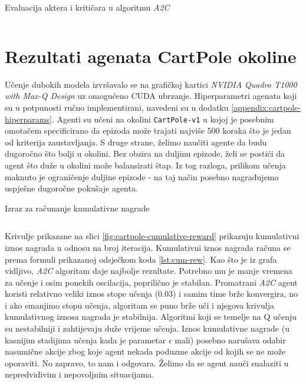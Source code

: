 \begin{listing}[H]
    \caption{Evaluacija aktera i kritičara u algoritmu \textit{A2C}}
    \inputminted{python}{snippets/a2c-eval.py}
    \label{lst:a2c-eval}
\end{listing}

\section{Rezultati agenata CartPole okoline}

Učenje dubokih modela izvršavalo se na grafičkoj kartici \textit{NVIDIA Quadro T1000 with Max-Q Design} uz omogućeno CUDA ubrzanje. Hiperparametri agenata koji su u potpunosti ručno implementirani, navedeni su u dodatku \ref{appendix:cartpole-hiperparams}. Agenti su učeni na okolini \texttt{CartPole-v1} u kojoj je posebnim omotačem specificirano da epizoda može trajati najviše $500$ koraka što je jedan od kriterija zaustavljanja. S druge strane, želimo naučiti agente da budu dugoročno što bolji u okolini. Bez obzira na duljinu epizode, želi se postići da agent što duže u okolini može balansirati štap. Iz tog razloga, prilikom učenja maknuto je ograničenje duljine epizode - na taj način posebno nagrađujemo uspješne dugoročne pokušaje agenta.

\begin{listing}[H]
    \caption{Izraz za računanje kumulativne nagrade}
    \inputminted{python}{snippets/cumulative_reward.py}
    \label{lst:cum-rew}
\end{listing}

Krivulje prikazane na slici \ref{fig:cartpole-cumulative-reward} prikazuju kumulativni iznos nagrada u odnosu na broj iteracija. Kumulativni iznos nagrada računa se prema formuli prikazanoj odsječkom koda \ref{lst:cum-rew}. Kao što je iz grafa vidljivo, \textit{A2C} algoritam daje najbolje rezultate. Potrebno mu je manje vremena za učenje i osim ponekih oscilacija, poprilično je stabilan. Promatrani \textit{A2C} agent koristi relativno veliki iznos stope učenja ($0.03$) i samim time brže konvergira, no i ako smanjimo stopu učenja, algoritam se puno brže uči i njegova krivulja kumulativnog iznosa nagrada je stabilnija. Algoritmi koji se temelje na Q učenju su nestabilniji i zahtijevaju duže vrijeme učenja. Iznos kumulativne nagrade (u kasnijim stadijima učenja kada je parametar $\epsilon$ mali) posebno narušava odabir nasumične akcije zbog koje agent nekada poduzme akcije od kojih se ne može oporaviti. No zapravo, to nam i odgovara. Želimo da se agent nauči snalaziti u nepredvidivim i nepovoljnim situacijama.

